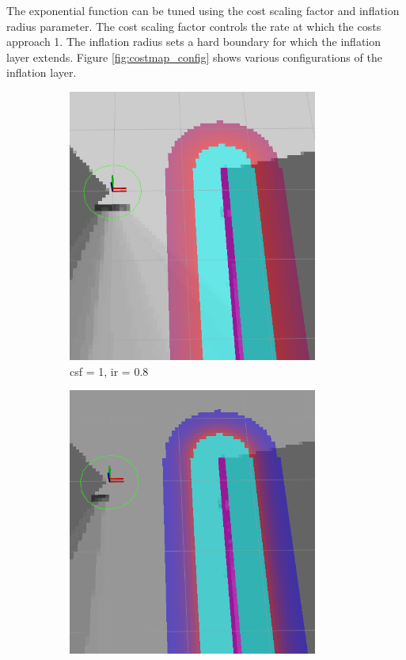 \documentclass[capstone_report.tex]{subfiles}
\begin{document}
The exponential function can be tuned using the cost scaling factor and inflation radius parameter.  The cost scaling factor controls the rate at which the costs approach 1.  The inflation radius sets a hard boundary for which the inflation layer extends.  Figure \ref{fig:costmap_config} shows various configurations of the inflation layer.\\

\begin{figure}[H]
    \centering
    \begin{subfigure}{0.33\textwidth}
        \centering
        \includegraphics[width=0.9\textwidth]{imgs/lcm/lcm_csf_1_ir_08.png}
        \caption{csf = 1, ir = 0.8}
    \end{subfigure}%
    \begin{subfigure}{0.33\textwidth}
        \centering
        \includegraphics[width=0.9\textwidth]{imgs/lcm/lcm_csf_553_ir_08.png}

\end{subfigure}
\end{figure}
\end{document}
